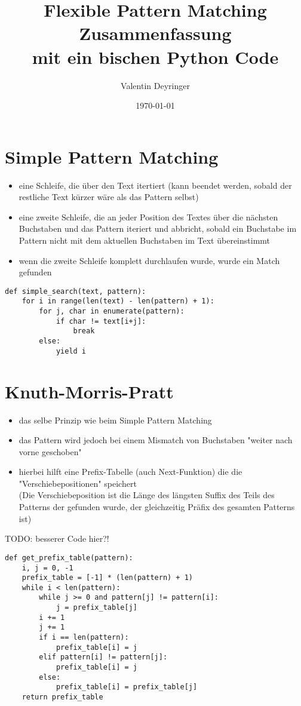 \documentclass[11pt]{article}
\title{\textbf{Flexible Pattern Matching\\ Zusammenfassung\\ \small mit ein bischen Python Code}}
\author{Valentin Deyringer}
\date{\today}
\begin{document}
\maketitle

\section{Simple Pattern Matching}

\begin{itemize}
	\item eine Schleife, die über den Text itertiert (kann beendet werden, sobald der restliche Text kürzer wäre als das Pattern selbst)
	\item eine zweite Schleife, die an jeder Position des Textes über die nächsten Buchstaben und das Pattern iteriert und abbricht, sobald ein Buchstabe im Pattern nicht mit dem aktuellen Buchstaben im Text übereinstimmt
	\item wenn die zweite Schleife komplett durchlaufen wurde, wurde ein Match gefunden
\end{itemize}

\begin{lstlisting}
def simple_search(text, pattern):
    for i in range(len(text) - len(pattern) + 1):
        for j, char in enumerate(pattern):
            if char != text[i+j]:
                break
        else:
            yield i   
\end{lstlisting}

\section{Knuth-Morris-Pratt}

\begin{itemize}
	\item das selbe Prinzip wie beim Simple Pattern Matching
	\item das Pattern wird jedoch bei einem Mismatch von Buchstaben "weiter nach vorne geschoben"
	\item hierbei hilft eine Prefix-Tabelle (auch Next-Funktion) die die "Verschiebepositionen" speichert \\
	(Die Verschiebeposition ist die Länge des längsten Suffix des Teils des Patterns der gefunden wurde, der gleichzeitig Präfix des gesamten Patterns ist)
\end{itemize}

TODO: besserer Code hier?!

\begin{lstlisting}
def get_prefix_table(pattern):
    i, j = 0, -1
    prefix_table = [-1] * (len(pattern) + 1)
    while i < len(pattern):
        while j >= 0 and pattern[j] != pattern[i]:
            j = prefix_table[j]
        i += 1
        j += 1
        if i == len(pattern):
            prefix_table[i] = j
        elif pattern[i] != pattern[j]:
            prefix_table[i] = j
        else:
            prefix_table[i] = prefix_table[j]
    return prefix_table
\end{lstlisting}
\end{document}
